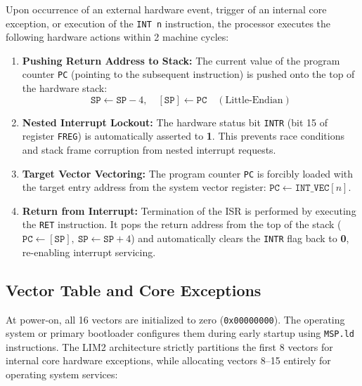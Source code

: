 \documentclass[11pt,a4paper]{article}
\begin{document}
\begin{archcallout}[title={Hardware Interrupt Trap Sequence (Trap Cycle)}]
Upon occurrence of an external hardware event, trigger of an internal core exception, or execution of the \texttt{INT n} instruction, the processor executes the following hardware actions within 2 machine cycles:
\begin{enumerate}
    \item \textbf{Pushing Return Address to Stack:} The current value of the program counter \texttt{PC} (pointing to the subsequent instruction) is pushed onto the top of the hardware stack:
    \[
    \texttt{SP} \leftarrow \texttt{SP} - 4, \quad [\texttt{SP}] \leftarrow \texttt{PC} \quad (\text{Little-Endian})
    \]
    \item \textbf{Nested Interrupt Lockout:} The hardware status bit \texttt{INTR} (bit 15 of register \texttt{FREG}) is automatically asserted to \textbf{1}. This prevents race conditions and stack frame corruption from nested interrupt requests.
    \item \textbf{Target Vector Vectoring:} The program counter \texttt{PC} is forcibly loaded with the target entry address from the system vector register: \(\texttt{PC} \leftarrow \texttt{INT\_VEC}[n]\).
    \item \textbf{Return from Interrupt:} Termination of the ISR is performed by executing the \texttt{RET} instruction. It pops the return address from the top of the stack (\(\texttt{PC} \leftarrow [\texttt{SP}], \ \texttt{SP} \leftarrow \texttt{SP} + 4\)) and automatically clears the \texttt{INTR} flag back to \textbf{0}, re-enabling interrupt servicing.
\end{enumerate}
\end{archcallout}

\clearpage

\subsection{Vector Table and Core Exceptions}

At power-on, all 16 vectors are initialized to zero (\texttt{0x00000000}). The operating system or primary bootloader configures them during early startup using \texttt{MSP.ld} instructions. The LIM2 architecture strictly partitions the first 8 vectors for internal core hardware exceptions, while allocating vectors 8--15 entirely for operating system services:
\end{document}
